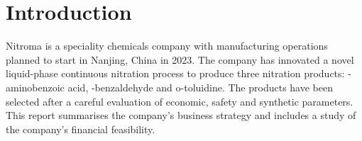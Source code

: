 \section{Introduction}
Nitroma is a speciality chemicals company with manufacturing operations planned to start in Nanjing, China in 2023. The company has innovated a novel liquid-phase continuous nitration process to produce three nitration products: \para-aminobenzoic acid, \para-benzaldehyde and o-toluidine. The products have been selected after a careful evaluation of economic, safety and synthetic parameters. This report summarises the company’s business strategy and includes a study of the company’s financial feasibility. 